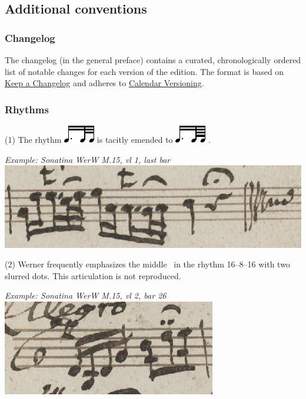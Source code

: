 \documentclass{ees}
\begin{document}
\subsection{Additional conventions}

\subsubsection{Changelog}

The changelog (in the general preface) contains a curated, chronologically ordered list of notable changes for each version of the edition. The format is based on \href{https://keepachangelog.com/en/1.0.0/}{Keep a Changelog} and adheres to \href{https://calver.org}{Calendar Versioning}.

\subsubsection{Rhythms}

(1) The rhythm \includegraphics[scale=.75]{rhythm_16d_32_32} is tacitly emended to \includegraphics[scale=.75]{rhythm_16d_64_64} .

\textit{Example: Sonatina WerW M.15, vl 1, last bar}\\
\includegraphics{example_M_15_a}

(2) Werner frequently emphasizes the middle \eighthNote\ in the rhythm 16–8–16 with two slurred dots. This articulation is not reproduced.

\textit{Example: Sonatina WerW M.15, vl 2, bar 26}\\
\includegraphics{example_M_15_b}
\end{document}
